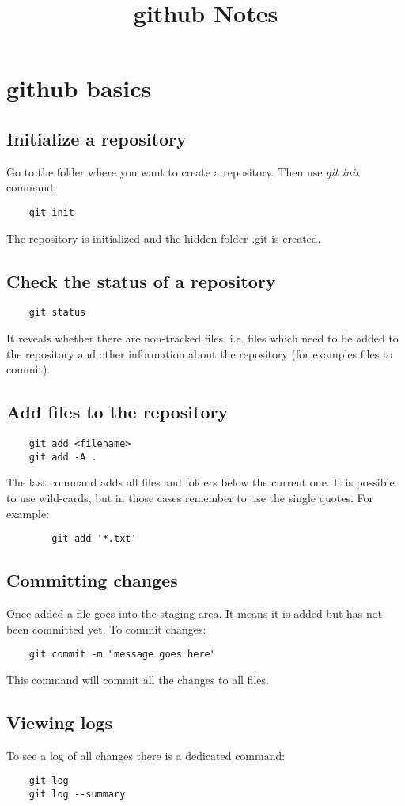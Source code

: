 \documentclass[10pt,letterpaper]{book}
\begin{document}
\title{github Notes}
\tableofcontents
\chapter{github basics}
\section{Initialize a repository}
Go to the folder where you want to create a repository. Then use \textit{git init} command:
\begin{lstlisting}
	git init
\end{lstlisting}
The repository is initialized and the hidden folder .git is created.
\section{Check the status of a repository}
\begin{lstlisting}
	git status
\end{lstlisting}
It reveals whether there are non-tracked files. i.e. files which need to be added to the repository and other information about the repository (for examples files to commit).

\section{Add files to the repository}
\begin{lstlisting}
	git add <filename>
	git add -A .
\end{lstlisting}
The last command adds all files and folders below the current one.
It is possible to use wild-cards, but in those cases remember to use the single quotes. For example:
\begin{lstlisting}
        git add '*.txt'
\end{lstlisting}

\section{Committing changes}
Once added a file goes into the staging area. It means it is added but has not been committed yet. To commit changes:
\begin{lstlisting}
	git commit -m "message goes here"
\end{lstlisting}
This command will commit all the changes to all files.

\section{Viewing logs}
To see a log of all changes there is a dedicated command:
\begin{lstlisting}
	git log
	git log --summary
\end{lstlisting}
\end{document}
